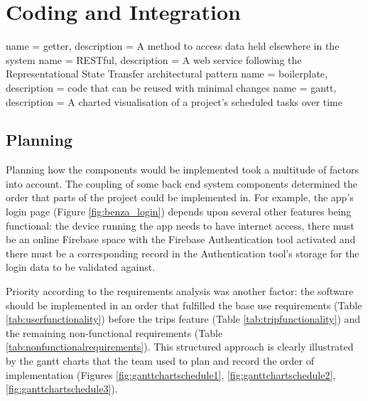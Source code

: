 \documentclass{article}
\begin{document}
\newpage
\section{Coding and Integration}
\label{sec:coding}
    {
        name = getter,
        description = {A method to access data held elsewhere in the system}
    }
    {
        name = RESTful,
        description = {A web service following the Representational State Transfer architectural pattern}
    }
    {
        name = boilerplate,
        description = {code that can be reused with minimal changes}
    }
    {
        name = gantt,
        description = {A charted visualisation of a project's scheduled tasks over time}
    }
    
    \subsection{Planning}
    \label{subsec:planning}
    Planning how the components would be implemented took a multitude of factors into account. The coupling of some back end system components determined the order that parts of the project could be implemented in. For example, the \gls{app}'s login page (Figure \ref{fig:benza_login}) depends upon several other features being functional: the device running the app needs to have internet access, there must be an online Firebase space with the Firebase Authentication tool activated and there must be a corresponding record in the Authentication tool's storage for the login data to be validated against. \par
    
    Priority according to the requirements analysis was another factor: the software should be implemented in an order that fulfilled the base use requirements (Table \ref{tab:userfunctionality}) before the trips feature (Table \ref{tab:tripfunctionality}) and the remaining non-functional requirements (Table \ref{tab:nonfunctionalrequirements}). This structured approach is clearly illustrated by the \Gls{gantt} charts that the team used to plan and record the order of implementation (Figures \ref{fig:ganttchartschedule1}, \ref{fig:ganttchartschedule2}, \ref{fig:ganttchartschedule3}). \par
    
\end{document}

